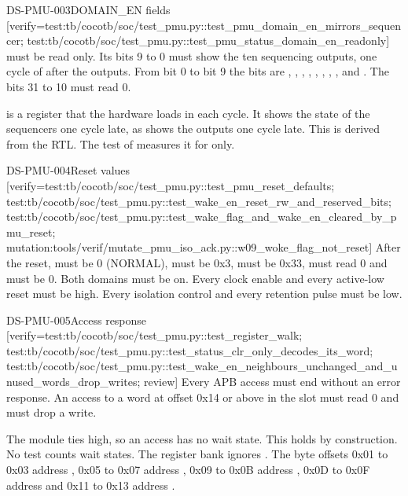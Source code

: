 \begin{requirement}{DS-PMU-003}{DOMAIN\_EN fields}
[verify={test:tb/cocotb/soc/test_pmu.py::test_pmu_domain_en_mirrors_sequencer; test:tb/cocotb/soc/test_pmu.py::test_pmu_status_domain_en_readonly}]
 must be read only. Its bits 9 to 0 must show the ten sequencing outputs, one cycle of  after the outputs. From bit 0 to bit 9 the bits are , , , , , , , ,  and . The bits 31 to 10 must read 0.
\end{requirement}
\begin{information}
 is a register that the hardware loads in each cycle. It shows the state of the sequencers one cycle late, as  shows the outputs one cycle late. This is derived from the RTL. The test of  measures it for  only.
\end{information}

\begin{requirement}{DS-PMU-004}{Reset values}
[verify={test:tb/cocotb/soc/test_pmu.py::test_pmu_reset_defaults; test:tb/cocotb/soc/test_pmu.py::test_wake_en_reset_rw_and_reserved_bits; test:tb/cocotb/soc/test_pmu.py::test_wake_flag_and_wake_en_cleared_by_pmu_reset; mutation:tools/verif/mutate_pmu_iso_ack.py::w09_woke_flag_not_reset}]
After the reset,  must be 0 (NORMAL),  must be 0x3,  must be 0x33,  must read 0 and  must be 0. Both domains must be on. Every clock enable and every active-low reset must be high. Every isolation control and every retention pulse must be low.
\end{requirement}

\begin{requirement}{DS-PMU-005}{Access response}
[verify={test:tb/cocotb/soc/test_pmu.py::test_register_walk; test:tb/cocotb/soc/test_pmu.py::test_status_clr_only_decodes_its_word; test:tb/cocotb/soc/test_pmu.py::test_wake_en_neighbours_unchanged_and_unused_words_drop_writes; review}]
Every APB access must end without an error response. An access to a word at offset 0x14 or above in the slot must read 0 and must drop a write.
\end{requirement}
\begin{information}
The module ties  high, so an access has no wait state. This holds by construction. No test counts wait states. The register bank ignores . The byte offsets 0x01 to 0x03 address , 0x05 to 0x07 address , 0x09 to 0x0B address , 0x0D to 0x0F address  and 0x11 to 0x13 address .
\end{information}

